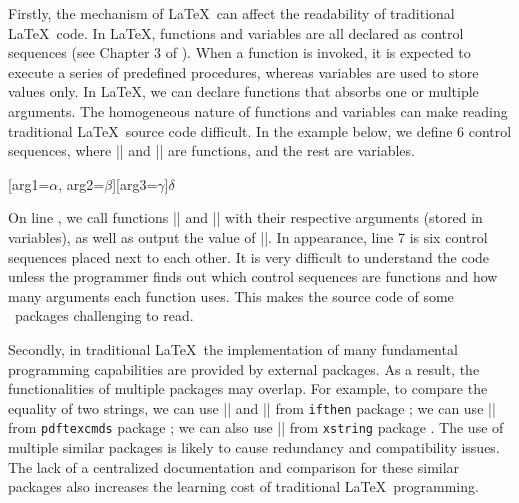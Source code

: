\documentclass{ltugboat}
\begin{document}
Firstly, the mechanism of \LaTeX~can affect the readability of traditional \LaTeX~code. 
In \LaTeX, functions and variables are all declared as control sequences (see Chapter 3 of \cite{knuth1984texbook}).
When a function is invoked, it is expected to execute a series of predefined procedures, whereas variables are used to store values only.
In \LaTeX, we can declare functions that absorbs one or multiple arguments. 
The homogeneous nature of functions and variables can make reading traditional \LaTeX\ source code difficult.
In the example below, we define 6 control sequences, where \inltex|\ta| and \inltex|\td| are functions, and the rest are variables.
\begin{latexsample*}
\newcommand{\ta}[2]{[arg1={#1}, arg2={#2}]}
\newcommand{\tb}{$\alpha$}
\newcommand{\tc}{$\beta$}
\newcommand{\td}[1]{[arg3={#1}]}
\newcommand{\te}{$\gamma$}
\newcommand{\tf}{$\delta$}
\ta\tb\tc\td\te\tf
\end{latexsample*}
\noindent On line \footnotemark, we call functions \inltex|\ta| and \inltex|\td| with their respective arguments (stored in variables), as well as output the value of \inltex|\tf|.
In appearance, line 7 is six control sequences placed next to each other.
It is very difficult to understand the code unless the programmer finds out which control sequences are functions and how many arguments each function uses.
This makes the source code of some \LaTeXe\ packages challenging to read.


Secondly, in traditional \LaTeX~the implementation of many fundamental programming capabilities are provided by external packages.
As a result, the functionalities of multiple packages may overlap. 
For example, to compare the equality of two strings, we can use \inltex|\ifthenelse| and \inltex|\equal| from \verb|ifthen| package \cite{pkg:ifthen};
we can use \inltex|\pdfstrcmp| from \verb|pdftexcmds| package \cite{pkg:pdftexcmds};
we can also use \inltex|\IfStrEq| from \verb|xstring| package \cite{pkg:xstring}. 
The use of multiple similar packages is likely to cause redundancy and compatibility issues.
The lack of a centralized documentation and comparison for these similar packages also increases the learning cost of traditional \LaTeX~programming.
\end{document}
